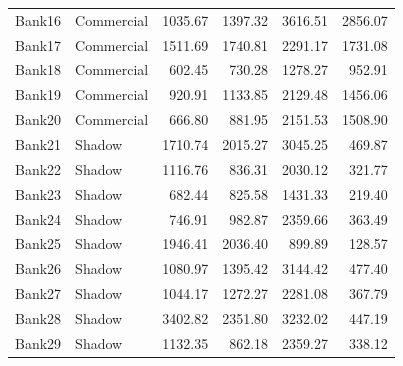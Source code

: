 \begin{longtable}{@{}llrrrr@{}}
Bank16 & Commercial & 1035.67 & 1397.32 & 3616.51 & 2856.07 \\
Bank17 & Commercial & 1511.69 & 1740.81 & 2291.17 & 1731.08 \\
Bank18 & Commercial & 602.45 & 730.28 & 1278.27 & 952.91 \\
Bank19 & Commercial & 920.91 & 1133.85 & 2129.48 & 1456.06 \\
Bank20 & Commercial & 666.80 & 881.95 & 2151.53 & 1508.90 \\
Bank21 & Shadow & 1710.74 & 2015.27 & 3045.25 & 469.87 \\
Bank22 & Shadow & 1116.76 & 836.31 & 2030.12 & 321.77 \\
Bank23 & Shadow & 682.44 & 825.58 & 1431.33 & 219.40 \\
Bank24 & Shadow & 746.91 & 982.87 & 2359.66 & 363.49 \\
Bank25 & Shadow & 1946.41 & 2036.40 & 899.89 & 128.57 \\
Bank26 & Shadow & 1080.97 & 1395.42 & 3144.42 & 477.40 \\
Bank27 & Shadow & 1044.17 & 1272.27 & 2281.08 & 367.79 \\
Bank28 & Shadow & 3402.82 & 2351.80 & 3232.02 & 447.19 \\
Bank29 & Shadow & 1132.35 & 862.18 & 2359.27 & 338.12 \\
\end{longtable}

